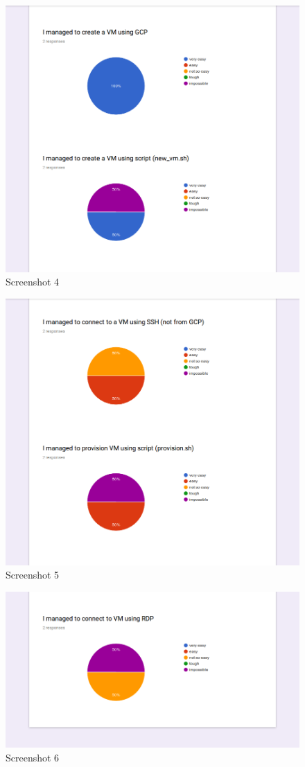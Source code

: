 	\begin{figure}
		 \centering
		 \includegraphics[width=.5\textwidth]{Images/cropped/crop_4.png}
		 \caption{Screenshot 4}
		 \label{fig:survey4}
	\end{figure}
	\begin{figure}
		 \centering
		 \includegraphics[width=.5\textwidth]{Images/cropped/crop_5.png}
		 \caption{Screenshot 5}
		 \label{fig:survey5}
	\end{figure}
	\begin{figure}
		 \centering
		 \includegraphics[width=.5\textwidth]{Images/cropped/crop_6.png}
		 \caption{Screenshot 6}
		 \label{fig:survey6}
	\end{figure}
